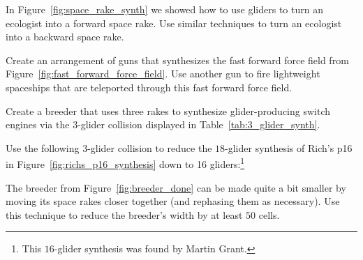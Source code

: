 \begin{multicols}{2}
	
	\mfilbreak
	
	
	\begin{problemstar}\label{exer:space_rake_synth} 
		In Figure~\ref{fig:space_rake_synth} we showed how to use gliders to turn an ecologist into a forward space rake. Use similar techniques to turn an ecologist into a backward space rake.
	\end{problemstar}
	
	
	\mfilbreak
	
	
	\begin{problem}\label{exer:synthesize_ffff} 
		Create an arrangement of guns that synthesizes the fast forward force field from Figure~\ref{fig:fast_forward_force_field}. Use another gun to fire lightweight spaceships that are teleported through this fast forward force field.
	\end{problem}


	\mfilbreak
	
	
	\begin{problem}\label{exer:glider_producing_switch_breeder} 
		Create a breeder that uses three rakes to synthesize glider-producing switch engines via the $3$-glider collision displayed in Table~\ref{tab:3_glider_synth}.
		
	\end{problem}
	
	
	\mfilbreak
	
	
	\begin{problem}\label{exer:rich_p16_16} 
		Use the following $3$-glider collision to reduce the $18$-glider synthesis of Rich's p16 in Figure~\ref{fig:richs_p16_synthesis} down to 16 gliders:\footnote{This $16$-glider synthesis was found by Martin Grant.}
		\begin{center}
		\end{center}
	\end{problem}
	
	
	\mfilbreak
	
	
	
	\begin{problem}\label{exer:breeder_minimize} 
		The breeder from Figure~\ref{fig:breeder_done} can be made quite a bit smaller by moving its space rakes closer together (and rephasing them as necessary). Use this technique to reduce the breeder's width by at least $50$ cells.
	\end{problem}
	

\end{multicols}
